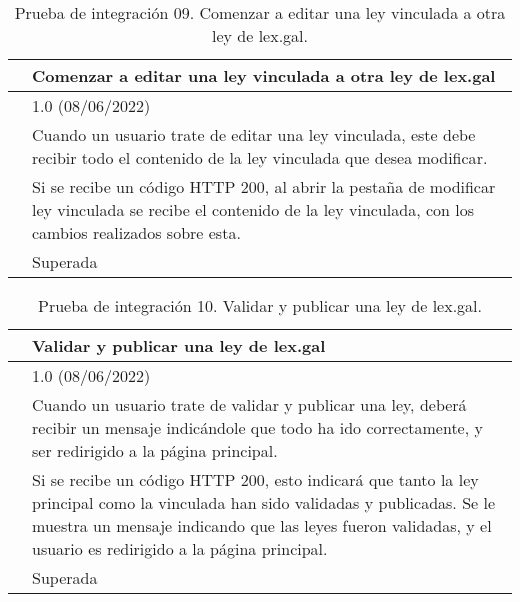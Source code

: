 \begin{table}[H]
\begin{center}
\begin{tabular}{|p{3cm}|p{10cm}|} \hline
\centering {\bf PI-09} & Comenzar a editar una ley vinculada a otra ley de lex.gal  \\ \hline\hline
\centering {\bf Versión} & 1.0 (08/06/2022) \\ \hline
\centering {\bf Descripción} & Cuando un usuario trate de editar una ley vinculada, este debe recibir todo el contenido de la ley vinculada que desea modificar. \\ \hline
\centering {\bf Criterio de aceptación} & Si se recibe un código HTTP 200, al abrir la pestaña de modificar ley vinculada se recibe el contenido de la ley vinculada, con los cambios realizados sobre esta. \\ \hline
\centering {\bf Estado} & Superada \\ \hline
\end{tabular}
\caption{Prueba de integración 09. Comenzar a editar una ley vinculada a otra ley de lex.gal.}
\label{enlacePI9}
\end{center}
\end{table}

\begin{table}[H]
\begin{center}
\begin{tabular}{|p{3cm}|p{10cm}|} \hline
\centering {\bf PI-10} & Validar y publicar una ley de lex.gal  \\ \hline\hline
\centering {\bf Versión} & 1.0 (08/06/2022) \\ \hline
\centering {\bf Descripción} & Cuando un usuario trate de validar y publicar una ley, deberá recibir un mensaje indicándole que todo ha ido correctamente, y ser redirigido a la página principal. \\ \hline
\centering {\bf Criterio de aceptación} & Si se recibe un código HTTP 200, esto indicará que tanto la ley principal como la vinculada han sido validadas y publicadas. Se le muestra un mensaje indicando que las leyes fueron validadas, y el usuario es redirigido a la página principal. \\ \hline
\centering {\bf Estado} & Superada \\ \hline
\end{tabular}
\caption{Prueba de integración 10. Validar y publicar una ley de lex.gal.}
\label{enlacePI10}
\end{center}
\end{table}

